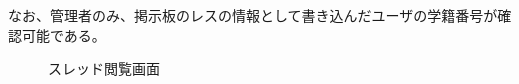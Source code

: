\documentclass[a4j]{jarticle}
\begin{document}
なお、管理者のみ、掲示板のレスの情報として書き込んだユーザの学籍番号が確認可能である。

\begin{figure}[H]
\centering
{}
\caption{スレッド閲覧画面}
\label{fig:read_thread}
\end{figure}
\end{document}
